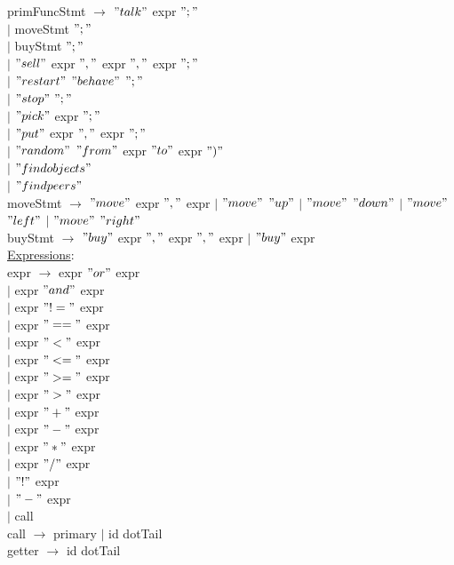 \documentclass{article}
\begin{document}
primFuncStmt 
$\rightarrow$ $"talk"$ expr $";"$ \\ 
$\vert$  moveStmt $";"$ \\
$\vert$ buyStmt $";"$ \\
$\vert$ $"sell"$ expr $","$ expr $","$ expr $";"$ \\
$\vert$ $"restart"$ $"behave"$ $";"$ \\
$\vert$ $"stop"$ $";"$ \\
$\vert$ $"pick"$ expr $";"$ \\
$\vert$ $"put"$ expr $","$ expr $";"$ \\
$\vert$ $"random"$ $"from"$ expr $"to"$ expr $")"$ \\
$\vert$ $"find objects"$ \\
$\vert$ $"find peers"$ \\

moveStmt $\rightarrow$ $"move"$ expr $","$ expr $\vert$ $"move"$ $"up"$ $\vert$ $"move"$ $"down"$ $\vert$ $"move"$ $"left"$ $\vert$ $"move"$ $"right"$ \\

buyStmt $\rightarrow$ $"buy"$ expr $","$ expr $","$ expr $\vert$ $"buy"$  expr\\

\underline{Expressions}: \\

expr $\rightarrow$ expr $"or"$ expr \\
$\vert$ expr $"and"$ expr \\
$\vert$ expr $"!="$ expr \\
$\vert$ expr $"=="$ expr \\
$\vert$ expr $"<"$ expr \\
$\vert$ expr $"<="$ expr \\
$\vert$ expr $">="$ expr \\
$\vert$ expr $">"$ expr \\
$\vert$ expr $"+"$ expr \\
$\vert$ expr $"-"$ expr \\
$\vert$ expr $"*"$ expr \\
$\vert$ expr $"/"$ expr \\
$\vert$ $"!"$ expr \\
$\vert$ $"-"$ expr \\
$\vert$ call \\

call $\rightarrow$ primary $\vert$ id dotTail \\

getter $\rightarrow$ id dotTail \\
\end{document}

